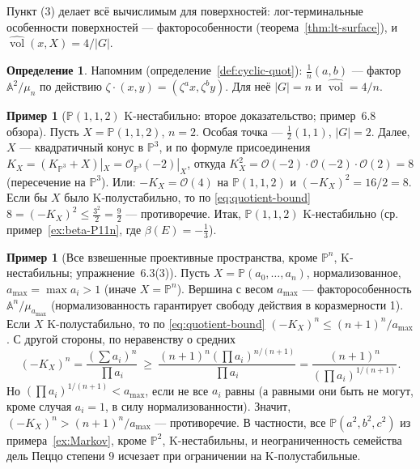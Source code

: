\documentclass[11pt,a4paper]{article}
\theoremstyle{plain}
\theoremstyle{definition}
\newtheorem{definition}[theorem]{Определение}
\newtheorem{example}[theorem]{Пример}
\theoremstyle{remark}
\newcommand{\PP}{\mathbb{P}}
\newcommand{\A}{\mathbb{A}}
\newcommand{\cO}{\mathcal{O}}
\DeclareMathOperator{\vol}{vol}
\newcommand{\hvol}{\widehat{\vol}}
\begin{document}
Пункт (3) делает всё вычислимым для поверхностей: лог-терминальные особенности поверхностей ---
факторособенности (теорема~\ref{thm:lt-surface}), и $\hvol(x,X)=4/|G|$.

\begin{definition}
Напомним (определение~\ref{def:cyclic-quot}): $\frac1n(a,b)$ --- фактор $\A^2/\mu_n$ по действию
$\zeta\cdot(x,y)=(\zeta^ax,\zeta^by)$. Для неё $|G|=n$ и $\hvol=4/n$.
\end{definition}

\begin{example}[$\PP(1,1,2)$ K-нестабильно: второе доказательство; пример~6.8 обзора]\label{ex:P112-nvol}
Пусть $X=\PP(1,1,2)$, $n=2$. Особая точка --- $\frac12(1,1)$, $|G|=2$. Далее, $X$ --- квадратичный
конус в $\PP^3$, и по формуле присоединения $K_X=(K_{\PP^3}+X)|_X=\cO_{\PP^3}(-2)|_X$, откуда
$K_X^2=\cO(-2)\cdot\cO(-2)\cdot\cO(2)=8$ (пересечение на $\PP^3$). Или: $-K_X=\cO(4)$ на $\PP(1,1,2)$
и $(-K_X)^2=16/2=8$. Если бы $X$ было K-полустабильно, то по \eqref{eq:quotient-bound}
$8=(-K_X)^2\le\frac{3^2}{2}=\frac92$ --- противоречие. Итак, $\PP(1,1,2)$ K-нестабильно (ср.
пример~\ref{ex:beta-P11n}, где $\beta(E)=-\frac13$).
\end{example}

\begin{example}[Все взвешенные проективные пространства, кроме $\PP^n$, K-нестабильны; упражнение~6.3(3)]\label{ex:wps-unstable}
Пусть $X=\PP(a_0,\dots,a_n)$, нормализованное, $a_{\max}=\max a_i>1$ (иначе $X=\PP^n$). Вершина
с весом $a_{\max}$ --- факторособенность $\A^n/\mu_{a_{\max}}$ (нормализованность гарантирует
свободу действия в коразмерности 1). Если $X$ K-полустабильно, то по \eqref{eq:quotient-bound}
$(-K_X)^n\le(n+1)^n/a_{\max}$. С другой стороны, по неравенству о средних
\[
(-K_X)^n=\frac{(\sum a_i)^n}{\prod a_i}\ \ge\ \frac{(n+1)^n(\prod a_i)^{n/(n+1)}}{\prod a_i}
=\frac{(n+1)^n}{(\prod a_i)^{1/(n+1)}} .
\]
Но $(\prod a_i)^{1/(n+1)}<a_{\max}$, если не все $a_i$ равны (а равными они быть не могут, кроме
случая $a_i=1$, в силу нормализованности). Значит, $(-K_X)^n>(n+1)^n/a_{\max}$ --- противоречие.
В частности, все $\PP(a^2,b^2,c^2)$ из примера~\ref{ex:Markov}, кроме $\PP^2$, K-нестабильны, и
неограниченность семейства дель Пеццо степени 9 исчезает при ограничении на K-полустабильные.
\end{example}
\end{document}
